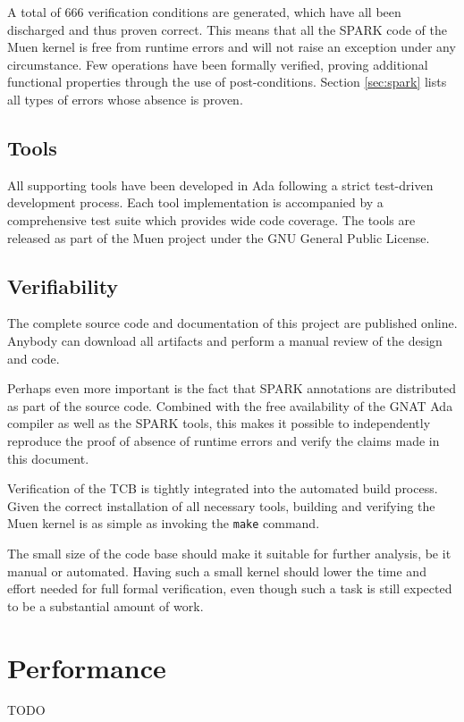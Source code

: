 A total of 666 verification conditions are generated, which have all been
discharged and thus proven correct. This means that all the SPARK code of the
Muen kernel is free from runtime errors and will not raise an exception under
any circumstance. Few operations have been formally verified, proving additional
functional properties through the use of post-conditions. Section
\ref{sec:spark} lists all types of errors whose absence is proven.

\subsection{Tools}
All supporting tools have been developed in Ada following a strict test-driven
development process. Each tool implementation is accompanied by a comprehensive
test suite which provides wide code coverage. The tools are released as part of
the Muen project under the GNU General Public License.

\subsection{Verifiability}
The complete source code and documentation of this project are published online.
Anybody can download all artifacts and perform a manual review of the design and
code.

Perhaps even more important is the fact that SPARK annotations are distributed
as part of the source code. Combined with the free availability of the GNAT Ada
compiler as well as the SPARK tools, this makes it possible to independently
reproduce the proof of absence of runtime errors and verify the claims made in
this document.

Verification of the TCB is tightly integrated into the automated build process.
Given the correct installation of all necessary tools, building and verifying
the Muen kernel is as simple as invoking the \texttt{make} command.

The small size of the code base should make it suitable for further analysis, be
it manual or automated. Having such a small kernel should lower the time and
effort needed for full formal verification, even though such a task is still
expected to be a substantial amount of work.

\section{Performance}\label{sec:performance}
TODO
